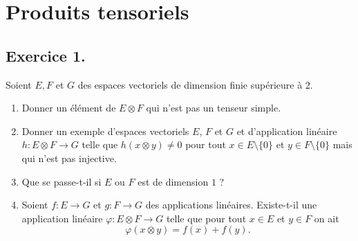 \documentclass[./main]{subfiles}
\begin{document}
  \chapter{Produits tensoriels}
  \minitoc

  \section{Exercice 1.}
  \begin{enonce}
    Soient $E, F$ et $G$ des espaces vectoriels de dimension finie supérieure à $2$.
    \begin{enumerate}
      \item Donner un élément de $E \otimes F$ qui n'est pas un tenseur simple.
      \item Donner un exemple d'espaces vectoriels $E$, $F$ et $G$ et d'application linéaire $h : E \otimes F \to G$ telle que $h(x \otimes y) \neq 0$ pour tout $x \in E \setminus \{0\}$ et $y \in F \setminus \{0\}$ mais qui n'est pas injective.
      \item Que se passe-t-il si $E$ ou $F$ est de dimension $1$ ?
      \item Soient $f : E \to G$ et $g : F \to G$ des applications linéaires. Existe-t-il une application linéaire $\varphi : E \otimes F \to G$ telle que pour tout $x \in E$ et $y \in F$ on ait \[
      \varphi(x \otimes y) = f(x) + f(y)
      .\] 
    \end{enumerate}
  \end{enonce}
\end{document}
